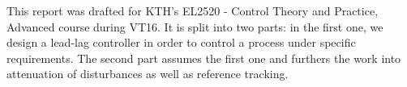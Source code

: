This report was drafted for KTH's EL2520 - Control Theory and Practice,
Advanced course during VT16. It is split into two parts: in the first one, we
design a lead-lag controller in order to control a process under specific
requirements.  The second part assumes the first one and furthers the work into
attenuation of disturbances as well as reference tracking.
